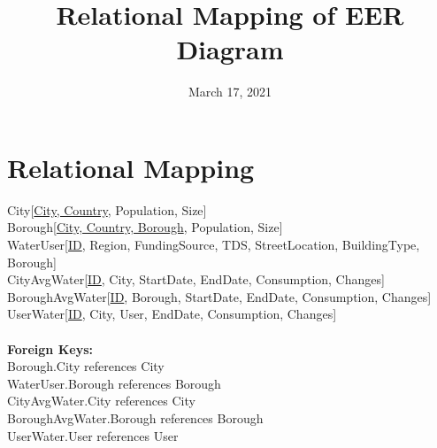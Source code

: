 \documentclass{article}
\title{Relational Mapping of EER Diagram}
\date{March 17, 2021}
\begin{document}
\maketitle


\section{Relational Mapping}
City[\underline{City, Country}, Population, Size] \\
Borough[\underline{City, Country, Borough}, Population, Size] \\
WaterUser[\underline{ID}, Region, FundingSource, TDS, StreetLocation, BuildingType, Borough] \\
CityAvgWater[\underline{ID}, City, StartDate, EndDate, Consumption, Changes] \\
BoroughAvgWater[\underline{ID}, Borough, StartDate, EndDate, Consumption, Changes] \\
UserWater[\underline{ID}, City, User, EndDate, Consumption, Changes] \\~\\
\textbf{Foreign Keys:} \\
Borough.City references City \\
WaterUser.Borough references Borough \\
CityAvgWater.City references City \\
BoroughAvgWater.Borough references Borough \\
UserWater.User references User
\end{document}
